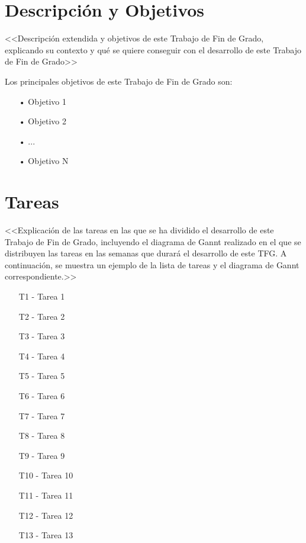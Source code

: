 



\renewcommand{\TituloTFG}{ Plan de Trabajo\\TITULO TFG}




\chapter*{Descripción y Objetivos}

<<Descripción extendida y objetivos de este Trabajo de Fin de Grado, explicando su contexto y qué se quiere conseguir con el desarrollo de este Trabajo de Fin de Grado>>

Los principales objetivos de este Trabajo de Fin de Grado son:
\begin{itemize}
    \item[•] Objetivo 1
    \item[•] Objetivo 2
    \item[•] ...
    \item[•] Objetivo N
\end{itemize}

\chapter*{Tareas}

<<Explicación de las tareas en las que se ha dividido el desarrollo de este Trabajo de Fin de Grado, incluyendo el diagrama de Gannt realizado en el que se distribuyen las tareas en las semanas que durará el desarrollo de este TFG. A continuación, se muestra un ejemplo de la lista de tareas y el diagrama de Gannt correspondiente.>>

\begin{enumerate}
    \item[T1 -] Tarea 1
    \item[T2 -] Tarea 2
    \item[T3 -] Tarea 3
    \item[T4 -] Tarea 4
    \item[T5 -] Tarea 5
    \item[T6 -] Tarea 6
    \item[T7 -] Tarea 7
    \item[T8 -] Tarea 8
    \item[T9 -] Tarea 9
    \item[T10 -] Tarea 10
    \item[T11 -] Tarea 11
    \item[T12 -] Tarea 12
    \item[T13 -] Tarea 13
\end{enumerate}


